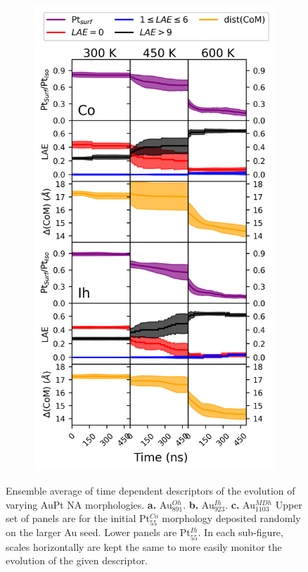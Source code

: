 \begin{figure}
\begin{subfigure}[b]{0.31\textwidth}
         \centering
         \includegraphics[width=\textwidth]{figures/MD/Coal/1103.png}
         \caption{}
         \label{fig:MD_Coal_1103}
     \end{subfigure}
    \caption{Ensemble average of time dependent descriptors of the evolution of varying AuPt NA morphologies. \textbf{a.} Au$_{891}^{Oh}$. \textbf{b.} Au$_{923}^{Ih}$. \textbf{c.} Au$_{1103}^{MDh}$ Upper set of panels are for the initial Pt$_{55}^{Co}$ morphology deposited randomly on the larger Au seed. Lower panels are Pt$_{55}^{Ih}$. In each sub-figure, scales horizontally are kept the same to more easily monitor the evolution of the given descriptor.}
    \label{fig:MD_Coal_Evo}
\end{figure}

